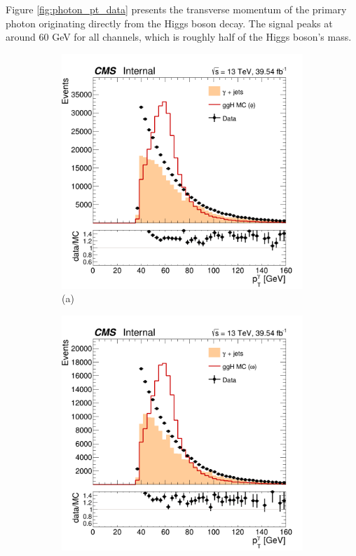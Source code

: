 Figure \ref{fig:photon_pt_data} presents the transverse momentum of the primary photon originating directly from the Higgs boson decay. The signal peaks at around 60 GeV for all channels, which is roughly half of the Higgs boson's mass.
\begin{figure}[!ht]
    \captionsetup[subfigure]{labelformat=empty}
    \vspace*{-0.2cm}
    \centering
    \setlength{\mylength}{\textwidth}
    \begin{subfigure}[t]{0.50\mylength}
        \centering
        \includegraphics[width=0.49\mylength]{resources/plots/Phi3_photon_pt.png}
        \vspace*{-0.2cm}
        \caption{\footnotesize (a)}
    \end{subfigure}%
    \begin{subfigure}[t]{0.50\mylength}
        \centering
        \includegraphics[width=0.49\mylength]{resources/plots/Omega_photon_pt.png}

\end{subfigure}
\end{figure}
